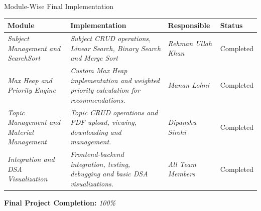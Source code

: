 \documentclass[aspectratio=169,11pt]{beamer}
\newcommand{\placeholder}[1]{%
\textit{\color{GEUGrey}#1}
}
\begin{document}
\begin{frame}{Module-Wise Final Implementation}

\scriptsize

\begin{center}

\renewcommand{\arraystretch}{1.35}

\begin{tabularx}{.96\textwidth}
{@{}p{2.4cm}X p{2.0cm}p{2.0cm}@{}}

\toprule
\textbf{Module} &
\textbf{Implementation} &
\textbf{Responsible} &
\textbf{Status}\\
\midrule

\placeholder{Subject Management and Search\/Sort } &
\placeholder{Subject CRUD operations, Linear Search, Binary Search and Merge Sort} &
\placeholder{Rehman Ullah Khan} &
Completed\\

\placeholder{Max Heap and Priority Engine} &
\placeholder{Custom Max Heap implementation and weighted priority calculation for recommendations. } &
\placeholder{Manan Lohni } &
Completed\\

\placeholder{Topic Management and Material Management } &
\placeholder{Topic CRUD operations and PDF upload, viewing, downloading and management.} &
\placeholder{Dipanshu Sirohi } &
Completed\\

\placeholder{Integration and DSA Visualization} &
\placeholder{Frontend-backend integration, testing, debugging and basic DSA visualizations.} &
\placeholder{ All Team Members} &
Completed\\

\bottomrule

\end{tabularx}

\end{center}

\vspace{1mm}

\begin{center}
\colorbox{GEULightBlue}{
\parbox{.65\textwidth}{
\centering
\textbf{Final Project Completion:}
\placeholder{100\%}
}}
\end{center}

\vfill



\end{frame}
\end{document}
